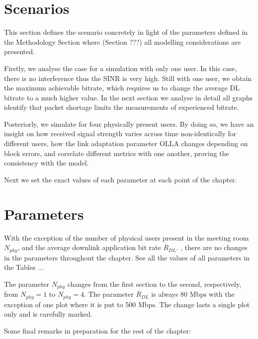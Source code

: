 \section{Scenarios}
\label{sec:scenarios}

This section defines the scenario concretely in light of the parameters defined in the Methodology Section where (Section ???) all modelling considerations are presented. 

Firstly, we analyse the case for a simulation with only one user. In this case, there is no interference thus the \ac{SINR} is very high. Still with one user, we obtain the maximum achievable bitrate, which requires us to change the average DL bitrate to a much higher value. In the next section we analyse in detail all graphs identify that packet shortage limits the measurements of experienced bitrate.

Posteriorly, we simulate for four physically present users. By doing so, we have an insight on how received signal strength varies across time non-identically for different users, how the link adaptation parameter \ac{OLLA} changes depending on block errors, and correlate different metrics with one another, proving the consistency with the model.

Next we set the exact values of each parameter at each point of the chapter.

\section*{Parameters}

With the exception of the number of physical users present in the meeting room $N_{phy}$, and the average downlink application bit rate $\overline{R}_{DL}$. , there are no changes in the parameters throughout the chapter. See all the values of all parameters in the Tables ...

The parameter $N_{phy}$ changes from the first section to the second, respectively, from $N_{phy} = 1$ to $N_{phy} = 4$. The parameter $\overline{R}_{DL}$ is always 80 Mbps with the exception of one plot where it is put to 500 Mbps. The change lasts a single plot only and is carefully marked.




Some final remarks in preparation for the rest of the chapter:


